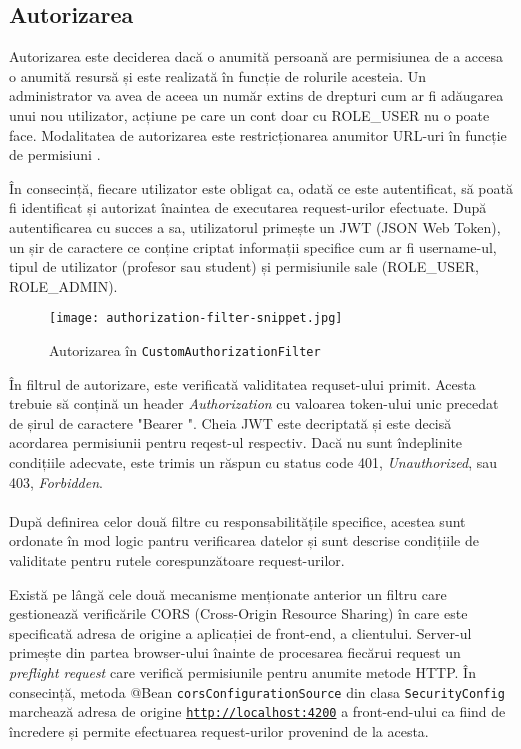 \subsection{Autorizarea}

Autorizarea este deciderea dacă o anumită persoană are permisiunea de a accesa o anumită resursă și este realizată în funcție de rolurile acesteia. Un administrator va avea de aceea un număr extins de drepturi cum ar fi adăugarea unui nou utilizator, acțiune pe care un cont doar cu ROLE\_USER nu o poate face. Modalitatea de autorizarea este restricționarea anumitor URL-uri în funcție de permisiuni \cite{spring-security}.

În consecință, fiecare utilizator este obligat ca, odată ce este autentificat, să poată fi identificat și autorizat înaintea de executarea request-urilor efectuate. După autentificarea cu succes a sa, utilizatorul primește un JWT (JSON Web Token), un șir de caractere ce conține criptat informații specifice cum ar fi username-ul, tipul de utilizator (profesor sau student) și permisiunile sale (ROLE\_USER, ROLE\_ADMIN).

\begin{figure}[H]
	\centering
	\texttt{[image: authorization-filter-snippet.jpg]}
	\caption{Autorizarea în \texttt{CustomAuthorizationFilter}}
\end{figure}

În filtrul de autorizare, este verificată validitatea requset-ului primit. Acesta trebuie să conțină un header \textit{Authorization} cu valoarea token-ului unic precedat de șirul de caractere "Bearer ". Cheia JWT este decriptată și este decisă acordarea permisiunii pentru reqest-ul respectiv. Dacă nu sunt îndeplinite condițiile adecvate, este trimis un răspun cu status code 401, \textit{Unauthorized}, sau 403, \textit{Forbidden}.
\\~\\
\indent După definirea celor două filtre cu responsabilitățile specifice, acestea sunt ordonate în mod logic pantru verificarea datelor și sunt descrise condițiile de validitate pentru rutele corespunzătoare request-urilor.

Există pe lângă cele două mecanisme menționate anterior un filtru care gestionează verificările CORS (Cross-Origin Resource Sharing) în care este specificată adresa de origine a aplicației de front-end, a clientului. Server-ul primește din partea browser-ului înainte de procesarea fiecărui request un \textit{preflight request} care verifică permisiunile pentru anumite metode HTTP. În consecință, metoda @Bean \texttt{corsConfigurationSource} din clasa \texttt{SecurityConfig} marchează adresa de origine \texttt{\url{http://localhost:4200}} a front-end-ului ca fiind de încredere și permite efectuarea request-urilor provenind de la acesta.